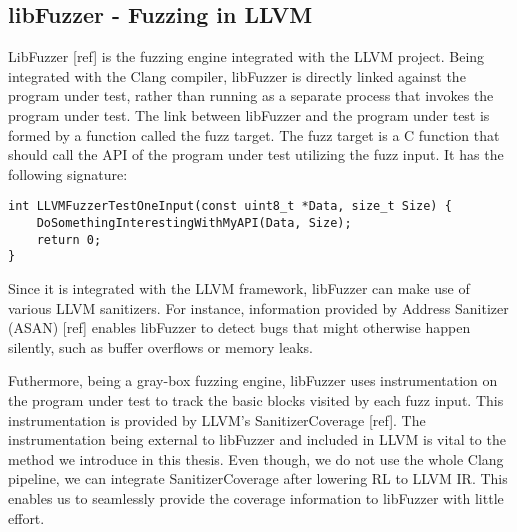 \subsection{libFuzzer - Fuzzing in LLVM}
LibFuzzer [ref] is the fuzzing engine integrated with the LLVM project.
Being integrated with the Clang compiler, libFuzzer is directly linked against the program under test, rather than running as a separate process that invokes the program under test.
The link between libFuzzer and the program under test is formed by a function called the fuzz target.
The fuzz target is a C function that should call the API of the program under test utilizing the fuzz input. 
It has the following signature:

\begin{lstlisting}  
int LLVMFuzzerTestOneInput(const uint8_t *Data, size_t Size) {
    DoSomethingInterestingWithMyAPI(Data, Size);
    return 0;
}
\end{lstlisting}

Since it is integrated with the LLVM framework, libFuzzer can make use of various LLVM sanitizers.
For instance, information provided by Address Sanitizer (ASAN) [ref] enables libFuzzer to detect bugs that might otherwise happen silently, such as buffer overflows or memory leaks.

Futhermore, being a gray-box fuzzing engine, libFuzzer uses instrumentation on the program under test to track the basic blocks visited by each fuzz input.
This instrumentation is provided by LLVM's SanitizerCoverage [ref].
The instrumentation being external to libFuzzer and included in LLVM is vital to the method we introduce in this thesis.
Even though, we do not use the whole Clang pipeline, we can integrate SanitizerCoverage after lowering RL to LLVM IR.
This enables us to seamlessly provide the coverage information to libFuzzer with little effort.